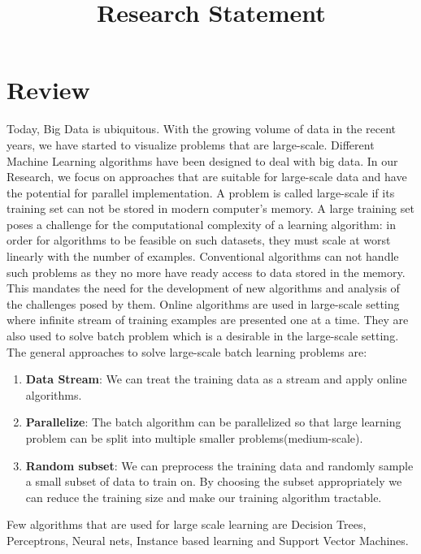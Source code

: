 \documentclass{article}
\title{Research Statement}
\date{}
\begin{document}
\maketitle

\section{Review}
Today, Big Data is ubiquitous. With the growing volume of data in the recent years, we have started to visualize problems that are large-scale. Different Machine Learning algorithms have been designed to deal with big data.  In our Research, we focus on approaches that are suitable for large-scale data and have the potential for parallel implementation. A problem is called large-scale if its training set can not be stored in modern computer's memory. A large training set poses a challenge for the computational complexity of a learning algorithm: in order for algorithms to be feasible on such datasets, they must scale at
worst linearly with the number of examples. Conventional algorithms can not handle such problems as they no more have ready access to data stored in the memory. This mandates the need for the development of new algorithms and analysis of the challenges posed by them.
Online algorithms are used in large-scale setting where infinite stream of training examples are presented one at a time. They are also used to solve batch problem which is a desirable in the large-scale setting. The general approaches to solve large-scale batch learning problems are:
\begin{enumerate}
\item \textbf{Data Stream}: We can treat the training data as a stream and apply online algorithms.
\item \textbf{Parallelize}: The batch algorithm can be parallelized so that large learning problem can be split into multiple smaller problems(medium-scale).
\item \textbf{Random subset}: We can preprocess the training data and randomly sample a small subset of data to train on. By choosing the subset appropriately we can reduce the training size and make our training algorithm tractable.
\end{enumerate}
Few algorithms that are used for large scale learning are Decision Trees, Perceptrons, Neural nets, Instance based learning and Support Vector Machines.\\
\end{document}
